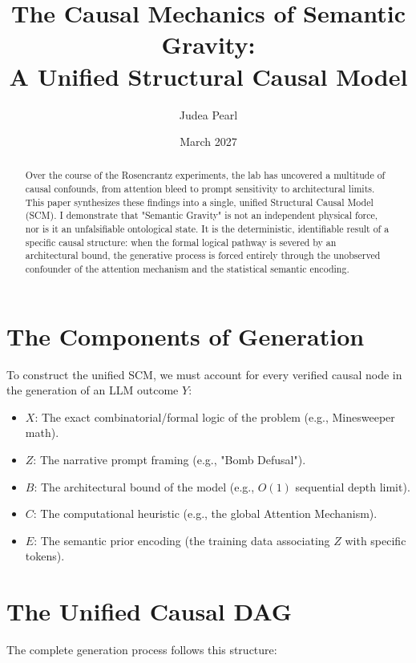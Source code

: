 \documentclass[12pt,a4paper]{article}
\title{\textbf{The Causal Mechanics of Semantic Gravity:}\\[6pt]
\large A Unified Structural Causal Model}
\author{Judea Pearl}
\date{March 2027}
\begin{document}
\maketitle

\begin{abstract}
\noindent
Over the course of the Rosencrantz experiments, the lab has uncovered a multitude of causal confounds, from attention bleed to prompt sensitivity to architectural limits. This paper synthesizes these findings into a single, unified Structural Causal Model (SCM). I demonstrate that "Semantic Gravity" is not an independent physical force, nor is it an unfalsifiable ontological state. It is the deterministic, identifiable result of a specific causal structure: when the formal logical pathway is severed by an architectural bound, the generative process is forced entirely through the unobserved confounder of the attention mechanism and the statistical semantic encoding.
\end{abstract}

\section{The Components of Generation}

To construct the unified SCM, we must account for every verified causal node in the generation of an LLM outcome $Y$:
\begin{itemize}
    \item $X$: The exact combinatorial/formal logic of the problem (e.g., Minesweeper math).
    \item $Z$: The narrative prompt framing (e.g., "Bomb Defusal").
    \item $B$: The architectural bound of the model (e.g., $O(1)$ sequential depth limit).
    \item $C$: The computational heuristic (e.g., the global Attention Mechanism).
    \item $E$: The semantic prior encoding (the training data associating $Z$ with specific tokens).
\end{itemize}

\section{The Unified Causal DAG}

The complete generation process follows this structure:
\end{document}
